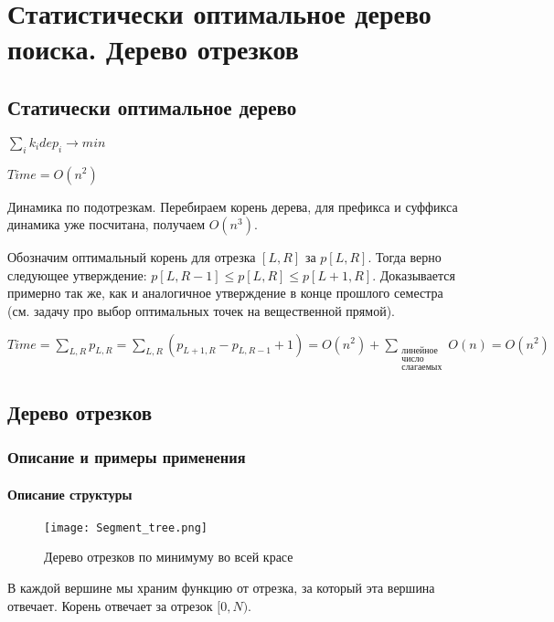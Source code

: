\chapter{Статистически оптимальное дерево поиска. Дерево отрезков}

\section{Статически оптимальное дерево}

$\sum \limits_i k_i dep_i \rightarrow min$

$Time = O(n^2)$

Динамика по подотрезкам.
Перебираем корень дерева, для префикса и суффикса динамика уже посчитана, получаем $O(n^3)$.

Обозначим оптимальный корень для отрезка $[L, R]$ за $p[L, R]$.
Тогда верно следующее утверждение: $p[L, R - 1] \le p[L, R] \le p[L + 1, R]$.
Доказывается примерно так же, как и аналогичное утверждение в конце прошлого семестра (см. задачу про выбор оптимальных точек на вещественной прямой).

$Time = \sum \limits_{L, R} p_{L,R} = \sum \limits_{L, R} (p_{L + 1, R} - p_{L, R - 1} + 1) = O(n^2) + \sum \limits_{\substack{\text{линейное}\\
\text{число}\\
\text{слагаемых}}}
O(n) = O(n^2)$

\section{Дерево отрезков}

\subsection{Описание и примеры применения}

\subsubsection{Описание структуры}

\begin{figure}[ht]
	\texttt{[image: Segment\_tree.png]}
	\caption{Дерево отрезков по минимуму во всей красе}
\end{figure}

В каждой вершине мы храним функцию от отрезка, за который эта вершина отвечает.
Корень отвечает за отрезок $[0, N)$.

